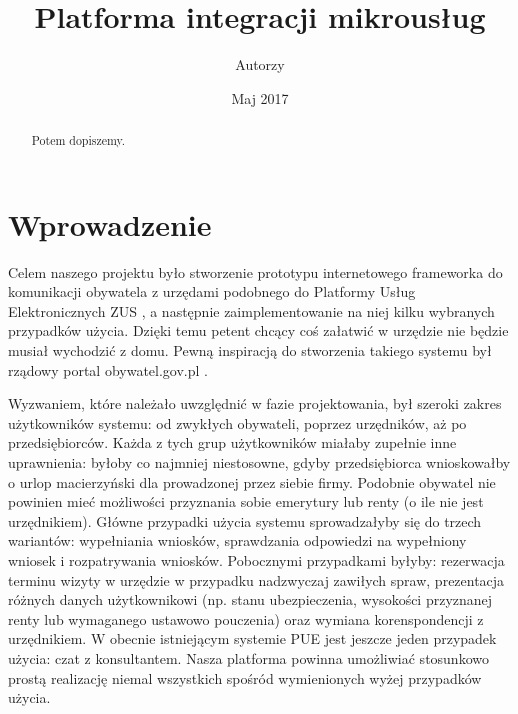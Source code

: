 \documentclass[licencjacka]{pracamgr}
\author{Autorzy}
\title{Platforma integracji mikrousług}
\date{Maj 2017}
\begin{document}
\maketitle

\begin{abstract}
  Potem dopiszemy.
\end{abstract}

\tableofcontents



\chapter*{Wprowadzenie}\label{r:wstep}

Celem naszego projektu było stworzenie prototypu internetowego frameworka do komunikacji obywatela z urzędami
podobnego do Platformy Usług Elektronicznych ZUS \cite{zuspue}, a następnie zaimplementowanie na niej kilku wybranych przypadków użycia. Dzięki temu petent chcący
coś załatwić w urzędzie nie będzie musiał wychodzić z domu. Pewną inspiracją do stworzenia takiego systemu był
rządowy portal obywatel.gov.pl \cite{mcobywatel}.

Wyzwaniem, które należało uwzględnić w fazie projektowania, był szeroki zakres użytkowników systemu: od zwykłych
obywateli, poprzez urzędników, aż po przedsiębiorców. Każda z tych grup użytkowników miałaby zupełnie inne uprawnienia:
byłoby co najmniej niestosowne, gdyby przedsiębiorca wnioskowałby o urlop macierzyński dla prowadzonej przez siebie
firmy. Podobnie obywatel nie powinien mieć możliwości przyznania sobie emerytury lub renty (o ile nie jest urzędnikiem). Główne przypadki użycia systemu sprowadzałyby się do trzech wariantów: wypełniania wniosków, sprawdzania
odpowiedzi na wypełniony wniosek i rozpatrywania wniosków. Pobocznymi przypadkami byłyby: rezerwacja terminu wizyty w
urzędzie w przypadku nadzwyczaj zawiłych spraw, prezentacja różnych danych użytkownikowi (np. stanu ubezpieczenia,
wysokości przyznanej renty lub wymaganego ustawowo pouczenia) oraz wymiana korenspondencji z urzędnikiem. W obecnie
istniejącym systemie PUE jest jeszcze jeden przypadek użycia: czat z konsultantem. Nasza platforma powinna umożliwiać
stosunkowo prostą realizację niemal wszystkich spośród wymienionych wyżej przypadków użycia.
\end{document}
